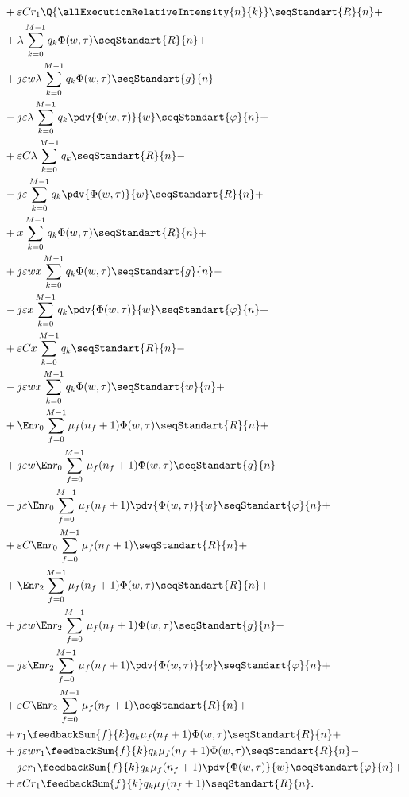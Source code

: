{\begin{align*}
    &+\varepsilon C r_1 \Q{\allExecutionRelativeIntensity{n}{k}} 
        \seqStandart{R}{n}+\\
    &+\lambda\sum_{k=0}^{M-1}q_k 
        \Phi(w, \tau)\seqStandart{R}{n}+\\
    &+j \varepsilon w \lambda\sum_{k=0}^{M-1}q_k 
        \Phi(w, \tau)\seqStandart{g}{n}-\\
    &-j \varepsilon \lambda\sum_{k=0}^{M-1}q_k 
        \pdv{\Phi(w, \tau)}{w}\seqStandart{\varphi}{n}+\\
    &+\varepsilon C \lambda\sum_{k=0}^{M-1}q_k 
        \seqStandart{R}{n}-\\
    &-j \varepsilon \sum_{k=0}^{M-1}q_k 
        \pdv{\Phi(w, \tau)}{w}\seqStandart{R}{n}+\\
    &+x \sum_{k=0}^{M-1}q_k 
        \Phi(w, \tau)\seqStandart{R}{n}+\\
    &+j \varepsilon w x \sum_{k=0}^{M-1}q_k 
        \Phi(w, \tau)\seqStandart{g}{n}-\\
    &-j \varepsilon x \sum_{k=0}^{M-1}q_k 
        \pdv{\Phi(w, \tau)}{w}\seqStandart{\varphi}{n}+\\
    &+\varepsilon C x \sum_{k=0}^{M-1}q_k 
        \seqStandart{R}{n}-\\
    &-j\varepsilon w x \sum_{k=0}^{M-1}q_k 
        \Phi(w, \tau)\seqStandart{w}{n}+\\
    &+\En r_0 \sum_{f=0}^{M-1} \mu_f (n_f + 1)
        \Phi(w, \tau)\seqStandart{R}{n}+\\
    &+j \varepsilon w\En r_0 \sum_{f=0}^{M-1} \mu_f (n_f + 1)
        \Phi(w, \tau)\seqStandart{g}{n}-\\
    &-j \varepsilon \En r_0 \sum_{f=0}^{M-1} \mu_f (n_f + 1)
        \pdv{\Phi(w, \tau)}{w}\seqStandart{\varphi}{n}+\\
    &+\varepsilon C \En r_0 \sum_{f=0}^{M-1} \mu_f (n_f + 1)
        \seqStandart{R}{n}+\\
    &+\En r_2 \sum_{f=0}^{M-1} \mu_f (n_f + 1)
        \Phi(w, \tau)\seqStandart{R}{n}+\\
    &+j \varepsilon w\En r_2 \sum_{f=0}^{M-1} \mu_f (n_f + 1)
        \Phi(w, \tau)\seqStandart{g}{n}-\\
    &-j \varepsilon \En r_2 \sum_{f=0}^{M-1} \mu_f (n_f + 1)
        \pdv{\Phi(w, \tau)}{w}\seqStandart{\varphi}{n}+\\
    &+\varepsilon C \En r_2 \sum_{f=0}^{M-1} \mu_f (n_f + 1)
        \seqStandart{R}{n}+\\
    &+r_1 \feedbackSum{f}{k} q_k \mu_f (n_f+1)
        \Phi(w, \tau)\seqStandart{R}{n}+\\
    &+j \varepsilon w r_1 \feedbackSum{f}{k} q_k \mu_f (n_f+1)
        \Phi(w, \tau)\seqStandart{R}{n}-\\
    &-j \varepsilon r_1 \feedbackSum{f}{k} q_k \mu_f (n_f+1)
        \pdv{\Phi(w, \tau)}{w}\seqStandart{\varphi}{n}+\\
    &+\varepsilon C r_1 \feedbackSum{f}{k} q_k \mu_f (n_f+1)
        \seqStandart{R}{n}.
\end{align*}}
